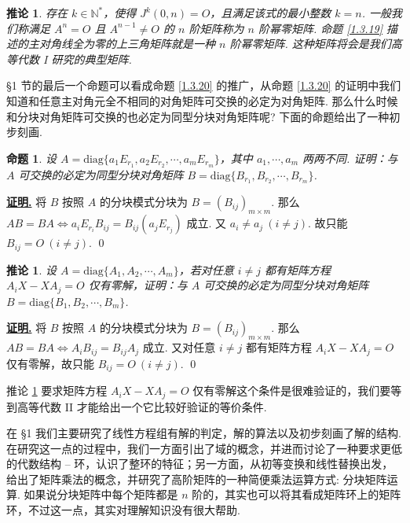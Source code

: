 \documentclass[10pt,openany]{article}
\theoremstyle{thmstyle} %
\theoremstyle{defstyle} %
\newtheorem{corollary}[theorem]{推论}
\theoremstyle{prostyle} %
\newtheorem{proposition}[theorem]{命题}
\theoremstyle{exastyle}
\theoremstyle{remstyle}
\renewenvironment{proof}[1][证明]{\par\underline{\textbf{#1.}} \;\fangsong}{\qed\par}
\newcommand{\diag}{\mathrm{diag}}
\begin{document}
\begin{corollary}
	存在 \( k \in \mathbb{N}^* \)，使得 \( J^k(0,n)=O \)，且满足该式的最小整数 \( k=n \). 一般我们称满足 \( A^n=O \) 且 \( A^{n-1} \neq O \) 的 \( n \) 阶矩阵称为 \( n \) 阶幂零矩阵. 命题 \ref{1.3.19} 描述的主对角线全为零的上三角矩阵就是一种 \( n \) 阶幂零矩阵. 这种矩阵将会是我们高等代数 I 研究的典型矩阵.
\end{corollary}

\S 1 节的最后一个命题可以看成命题 \ref{1.3.20} 的推广，从命题 \ref{1.3.20} 的证明中我们知道和任意主对角元全不相同的对角矩阵可交换的必定为对角矩阵. 那么什么时候和分块对角矩阵可交换的也必定为同型分块对角矩阵呢? 下面的命题给出了一种初步刻画.

\begin{proposition}
	设 \( A=\diag\{ a_1E_{r_1},a_2E_{r_2},\cdots,a_mE_{r_m}\} \)，其中 \( a_1,\cdots,a_m \) 两两不同. 证明：与 \( A \) 可交换的必定为同型分块对角矩阵 \( B=\diag\{B_{r_1},B_{r_2},\cdots,B_{r_m}\} \).
\end{proposition}

\begin{proof}
	将 \( B \) 按照 \( A \) 的分块模式分块为 \( B=(B_{ij})_{m \times m} \). 那么 \( AB=BA \Leftrightarrow a_iE_{r_i}B_{ij}=B_{ij}(a_jE_{r_j}) \) 成立. 又 \( a_i \neq a_j \ (i \neq j) \). 故只能 \( B_{ij}=O \ (i \neq j) \).
\end{proof}

\begin{corollary}
	设 \( A=\diag\{ A_1,A_2,\cdots,A_m\} \)，若对任意 \( i \neq j \) 都有矩阵方程 \( A_iX-XA_j=O \) 仅有零解，证明：与 \( A \) 可交换的必定为同型分块对角矩阵 \( B=\diag\{B_1,B_2,\cdots,B_m\} \).
	\label{1.4.9}
\end{corollary}

\begin{proof}
	将 \( B \) 按照 \( A \) 的分块模式分块为 \( B=(B_{ij})_{m \times m} \). 那么 \( AB=BA \Leftrightarrow A_iB_{ij}=B_{ij}A_j  \) 成立. 又对任意 \( i \neq j \) 都有矩阵方程 \( A_iX-XA_j=O \) 仅有零解，故只能 \( B_{ij}=O \ (i \neq j) \).
\end{proof}

\vspace{1ex}

推论 \ref{1.4.9} 要求矩阵方程 \( A_iX-XA_j=O \) 仅有零解这个条件是很难验证的，我们要等到高等代数 II 才能给出一个它比较好验证的等价条件.

在 \S 1 我们主要研究了线性方程组有解的判定，解的算法以及初步刻画了解的结构. 在研究这一点的过程中，我们一方面引出了域的概念，并进而讨论了一种要求更低的代数结构 -- 环，认识了整环的特征；另一方面，从初等变换和线性替换出发，给出了矩阵乘法的概念，并研究了高阶矩阵的一种简便乘法运算方式: 分块矩阵运算. 如果说分块矩阵中每个矩阵都是 \( n \) 阶的，其实也可以将其看成矩阵环上的矩阵环，不过这一点，其实对理解知识没有很大帮助.
\end{document}
